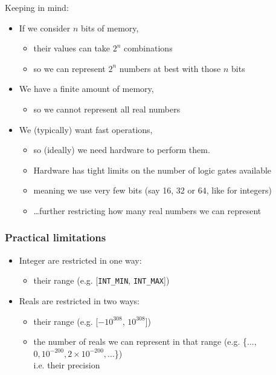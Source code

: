 \documentclass[12pt]{article}
\begin{document}
Keeping in mind:
\begin{itemize}
    \item If we consider $n$ bits of memory,
    \begin{itemize}
        \item their values can take $2^n$ combinations
        \item so we can represent $2^n$ numbers at best with those $n$ bits
    \end{itemize}
    \item We have a finite amount of memory,
    \begin{itemize}
        \item so we cannot represent all real numbers
    \end{itemize}
    \item We (typically) want fast operations,
    \begin{itemize}
        \item so (ideally) we need hardware to perform them.
        \item Hardware has tight limits on the number of logic gates available
        \item meaning we use very few bits (say 16, 32 or 64, like for integers)
        \item \ldots further restricting how many real numbers we can represent
    \end{itemize}
\end{itemize}

\subsubsection{Practical limitations}

\begin{itemize}
  \item Integer are restricted in one way:
  \begin{itemize}
    \item their range (e.g. [\texttt{INT\_MIN}, \texttt{INT\_MAX}])
  \end{itemize}
  \item Reals are restricted in two ways:
  \begin{itemize}
    \item their range (e.g. [$-10^{308}$, $10^{308}$])
    \item the number of reals we can represent in that range (e.g. \{..., $0, 10^{-200}, 2 \times 10^{-200}, ...$\})\\
    i.e. their precision
  \end{itemize}
\end{itemize}
\end{document}
